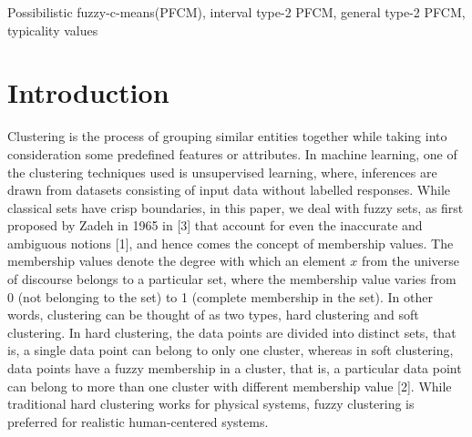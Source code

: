 \documentclass[journal, onecolumn]{IEEEtran}
\begin{document}
\begin{IEEEkeywords}
Possibilistic fuzzy-c-means(PFCM), interval type-2 PFCM, general type-2 PFCM, typicality values
\end{IEEEkeywords}






%
\IEEEpeerreviewmaketitle



\section{Introduction}
% 
% 
% 
% 
Clustering is the process of grouping similar entities together while taking into consideration some predefined features or attributes. In machine learning, one of the clustering techniques used is unsupervised learning, where, inferences are drawn from datasets consisting of input data without labelled responses. While classical sets have crisp boundaries, in this paper, we deal with fuzzy sets, as first proposed by Zadeh in 1965 in [3] that account for even the inaccurate and ambiguous notions [1], and hence comes the concept of membership values. The membership values denote the degree with which an element $x$ from the universe of discourse belongs to a particular set, where the membership value varies from 0 (not belonging to the set) to 1 (complete membership in the set).  In other words, clustering can be thought of as two types, hard clustering and soft clustering. In hard clustering, the data points are divided into distinct sets, that is, a single data point can belong to only one cluster, whereas in soft clustering, data points have a fuzzy membership in a cluster, that is, a particular data point can belong to more than one cluster with different membership value [2]. While traditional hard clustering works for physical systems, fuzzy clustering is preferred for realistic human-centered systems.
\end{document}
